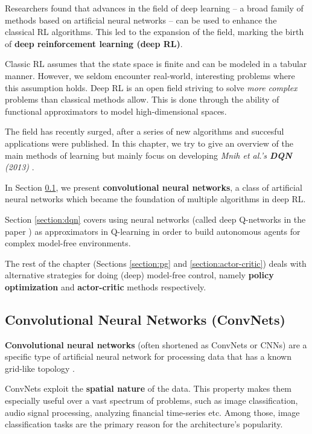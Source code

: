 Researchers found that advances in the field of deep learning -- a broad family of methods based on artificial neural networks -- can be used to enhance the classical RL algorithms.
This led to the expansion of the field, marking the birth of \textbf{deep reinforcement learning (deep RL)}.

Classic RL assumes that the state space is finite and can be modeled in a tabular manner.
However, we seldom encounter real-world, interesting problems where this assumption holds.
Deep RL is an open field striving to solve \emph{more complex} problems than classical methods allow.
This is done through the ability of functional approximators to model high-dimensional spaces.

The field has recently surged, after a series of new algorithms and succesful applications were published.
In this chapter, we try to give an overview of the main methods of learning but mainly focus on developing \emph{Mnih et al.'s \textbf{DQN} (2013)} \cite{atari-dqn}.

In Section \ref{section:convnets}, we present \textbf{convolutional neural networks}, a class of artificial neural networks which became the foundation of multiple algorithms in deep RL.

Section \ref{section:dqn} covers using neural networks (called deep Q-networks in the paper \cite{atari-dqn}) as approximators in Q-learning in order to build autonomous agents for complex model-free environments.

The rest of the chapter (Sections \ref{section:pg} and \ref{section:actor-critic}) deals with alternative strategies for doing (deep) model-free control, namely \textbf{policy optimization} and \textbf{actor-critic} methods respectively.

\clearpage

\subsection{Convolutional Neural Networks (ConvNets)} \label{section:convnets}
\textbf{Convolutional neural networks} (often shortened as ConvNets or CNNs) are a specific type of artificial neural network for processing data that has a known grid-like topology \cite{Goodfellow-et-al-2016}.

ConvNets exploit the \textbf{spatial nature} of the data.
This property makes them especially useful over a vast spectrum of problems, such as image classification, audio signal processing, analyzing financial time-series etc.
Among those, image classification tasks are the primary reason for the architecture's popularity.

